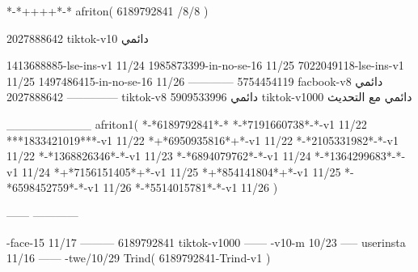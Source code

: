 *-*++++*-*
afriton(
6189792841 /8/8
)

2027888642 tiktok-v10
دائمي

1413688885-lse-ins-v1 11/24
1985873399-in-no-se-16 11/25
7022049118-lse-ins-v1 11/25
1497486415-in-no-se-16 11/26
------------
5754454119 facbook-v8
دائمي
--------------
2027888642 tiktok-v8
دائمي
5909533996 tiktok-v1000
دائمي مع التحديث

__________
afriton1(
*-*6189792841*-*
*-*7191660738*-*-v1 11/22
***1833421019***-v1 11/22
*+*6950935816*+*-v1 11/22
*-*2105331982*-*-v1 11/22
*-*1368826346*-*-v1 11/23
*-*6894079762*-*-v1 11/24
*-*1364299683*-*-v1 11/24
*+*7156151405*+*-v1 11/25
*+*854141804*+*-v1 11/25
*-*6598452759*-*-v1 11/26
*-*5514015781*-*-v1 11/26
)

------
------------

-face-15 11/17
---------
6189792841 tiktok-v1000
------
-v10-m 10/23
-----
userinsta 11/16
------
-twe/10/29
Trind(
6189792841-Trind-v1 
)
